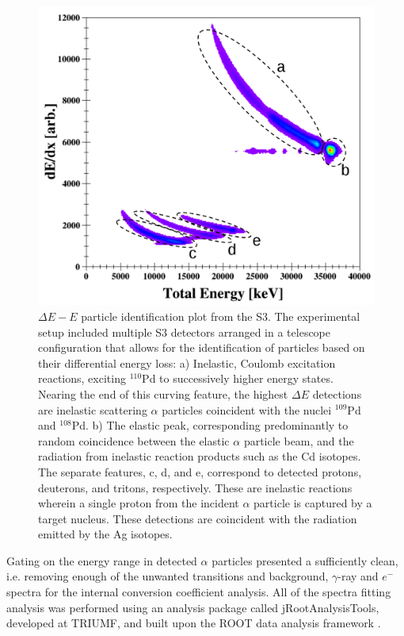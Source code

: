 \begin{figure}[!ht]
  \centering
  \includegraphics[width=\textwidth, height=0.84\textwidth]{techniques_particle_ID.png}
  \caption[$\Delta E - E$ particle identification plot from the S3 telescope.]{$\Delta E - E$ particle identification plot from the S3. The experimental setup included multiple S3 detectors arranged in a telescope configuration that allows for the identification of particles based on their differential energy loss: a) Inelastic, Coulomb excitation reactions, exciting $^{110}$Pd to successively higher energy states. Nearing the end of this curving feature, the highest $\Delta E$ detections are inelastic scattering $\alpha$ particles coincident with the nuclei $^{109}$Pd and $^{108}$Pd. b) The elastic peak, corresponding predominantly to random coincidence between the elastic $\alpha$ particle beam, and the radiation from inelastic reaction products such as the Cd isotopes. The separate features, c, d, and e, correspond to detected protons, deuterons, and tritons, respectively. These are inelastic reactions wherein a single proton from the incident $\alpha$ particle is captured by a target nucleus. These detections are coincident with the radiation emitted by the Ag isotopes.}
  \label{figure: particle ID with alpha energy}
\end{figure}

Gating on the energy range in detected $\alpha$ particles presented a sufficiently clean, i.e. removing enough of the unwanted transitions and background, $\gamma$-ray and $e^-$ spectra for the internal conversion coefficient analysis. All of the spectra fitting analysis was performed using an analysis package called jRootAnalysisTools, developed at TRIUMF, and built upon the ROOT data analysis framework \cite{Brun1997}.

